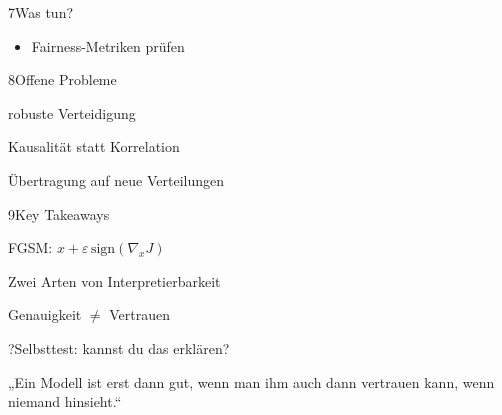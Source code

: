 \begin{hngrid}
\begin{hnp}[raster multicolumn=2,acc=hngreen]{7}{Was tun?}
\begin{itemize}
\item Fairness-Metriken prüfen
\end{itemize}
\end{hnp}
%
\begin{hnp}[raster multicolumn=2,acc=hnred]{8}{Offene Probleme}
\begin{hncon}
\item robuste Verteidigung
\item Kausalität statt Korrelation
\item Übertragung auf neue Verteilungen
\end{hncon}
\end{hnp}
%
\begin{hnp}[raster multicolumn=2,acc=hnorange]{9}{Key Takeaways}
\begin{hnchk}
\item FGSM: $x+\varepsilon\,\mathrm{sign}(\nabla_xJ)$
\item Zwei Arten von Interpretierbarkeit
\item Genauigkeit $\ne$ Vertrauen
\end{hnchk}
\end{hnp}
%
\begin{hnp}[raster multicolumn=6,acc=hnpurple,colback=hnlilac!30]{?}{Selbsttest: kannst du das erklären?}
\end{hnp}
%
\begin{hnbanner}[raster multicolumn=6]
„Ein Modell ist erst dann gut, wenn man ihm auch dann vertrauen kann, wenn niemand hinsieht.“
\end{hnbanner}
\end{hngrid}
